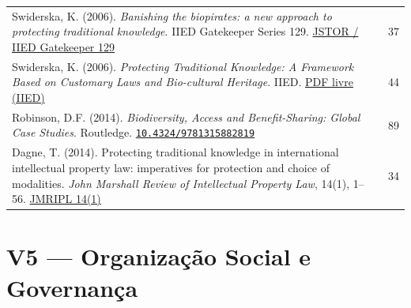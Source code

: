 \documentclass[a4paper,11pt]{article}
\newcommand{\doi}[1]{\href{https://doi.org/#1}{\texttt{#1}}}
\begin{document}
\begin{longtable}{>{\raggedright\arraybackslash}p{} c}
Swiderska, K. (2006). \textit{Banishing the biopirates: a new approach to protecting traditional knowledge}. IIED Gatekeeper Series 129.\newline
\href{https://www.jstor.org/stable/resrep01338}{JSTOR / IIED Gatekeeper 129} & 37 \\
\addlinespace

Swiderska, K. (2006). \textit{Protecting Traditional Knowledge: A Framework Based on Customary Laws and Bio-cultural Heritage}. IIED.\newline
\href{https://www.iied.org/sites/default/files/pdfs/migrate/G01069.pdf}{PDF livre (IIED)} & 44 \\
\addlinespace

Robinson, D.F. (2014). \textit{Biodiversity, Access and Benefit-Sharing: Global Case Studies}. Routledge.\newline
\doi{10.4324/9781315882819} & 89 \\
\addlinespace

Dagne, T. (2014). Protecting traditional knowledge in international intellectual property law: imperatives for protection and choice of modalities. \textit{John Marshall Review of Intellectual Property Law}, 14(1), 1--56.\newline
\href{https://repository.law.uic.edu/ripl/vol14/iss1/1/}{JMRIPL 14(1)} & 34 \\

\bottomrule
\end{longtable}

\section{V5 --- Organização Social e Governança}
\end{document}
